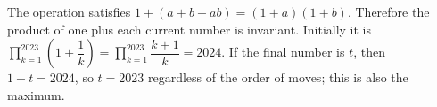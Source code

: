 The operation satisfies $1+(a+b+ab)=(1+a)(1+b)$. Therefore the product of one plus each current number is invariant. Initially it is $\prod_{k=1}^{2023}(1+\dfrac{1}{k})=\prod_{k=1}^{2023}\dfrac{k+1}{k}=2024$. If the final number is $t$, then $1+t=2024$, so $t=\boxed{2023}$ regardless of the order of moves; this is also the maximum.
